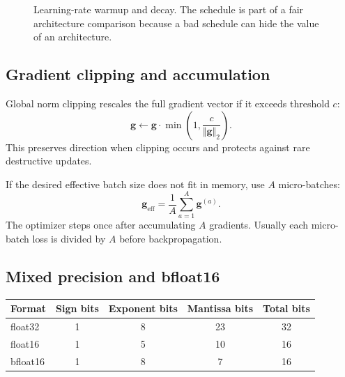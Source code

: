 \documentclass[11pt,a4paper]{article}
\theoremstyle{definition}
\theoremstyle{plain}
\begin{document}
\begin{figure}[H]
\centering
{}
\caption{Learning-rate warmup and decay. The schedule is part of a fair architecture comparison because a bad schedule can hide the value of an architecture.}
\label{fig:lr-schedule}
\end{figure}

\subsection{Gradient clipping and accumulation}

Global norm clipping rescales the full gradient vector if it exceeds threshold $c$:
\begin{equation}\label{eq:grad_clip}
    \bm g\leftarrow \bm g\cdot\min\left(1,\frac{c}{\Vert\bm g\Vert_2}\right).
\end{equation}
This preserves direction when clipping occurs and protects against rare destructive updates.

If the desired effective batch size does not fit in memory, use $A$ micro-batches:
\begin{equation}
    \bm g_{\mathrm{eff}}=\frac{1}{A}\sum_{a=1}^{A}\bm g^{(a)}.
\end{equation}
The optimizer steps once after accumulating $A$ gradients. Usually each micro-batch loss is divided by $A$ before backpropagation.

\subsection{Mixed precision and bfloat16}

\begin{center}
\begin{tabular}{lcccc}
\toprule
Format & Sign bits & Exponent bits & Mantissa bits & Total bits\\
\midrule
float32 & 1 & 8 & 23 & 32\\
float16 & 1 & 5 & 10 & 16\\
bfloat16 & 1 & 8 & 7 & 16\\
\bottomrule
\end{tabular}
\end{center}
\end{document}
